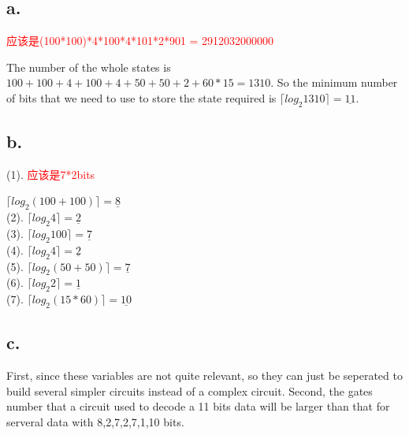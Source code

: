 \documentclass[11pt,a4paper]{article}
\begin{document}
	
	
	\section{}
	\subsection*{a.}
	\textcolor{red}{
		应该是(100*100)*4*100*4*101*2*901 = 2912032000000
	}\par
	The number of the whole states is $100+100+4+100+4+50+50+2+60*15=1310$. So the minimum number of bits that we need to use to store the state required is $\lceil log_{2}1310 \rceil = \underline{11}$.
	\subsection*{b.}
	(1). 
		\textcolor{red}{
			应该是7*2bits
		}\par
		 $\lceil log_{2}(100+100) \rceil = \underline{8}$\\
	(2). $\lceil log_{2}4 \rceil = \underline{2}$\\
	(3). $\lceil log_{2}100 \rceil = \underline{7}$\\
	(4). $\lceil log_{2}4 \rceil = \underline{2}$\\
	(5). $\lceil log_{2}(50+50) \rceil = \underline{7}$\\
	(6). $\lceil log_{2}2 \rceil = \underline{1}$\\
	(7). $\lceil log_{2}(15*60) \rceil = \underline{10}$\\
	\subsection*{c.}
	First, since these variables are not quite relevant, so they can just be seperated to build several simpler circuits instead of a complex circuit.
	Second, the gates number that a circuit used to decode a 11 bits data will be larger than that for serveral data with 8,2,7,2,7,1,10 bits.


	\section{}
\end{document}
